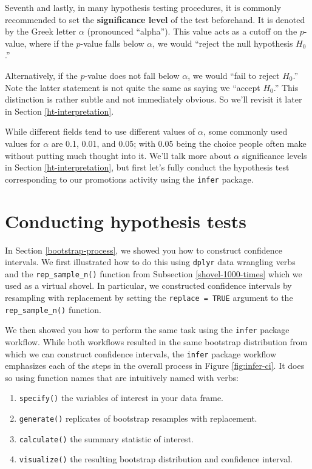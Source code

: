 \documentclass[
]{book}
\providecommand{\tightlist}{%
  \setlength{\itemsep}{0pt}\setlength{\parskip}{0pt}}
\begin{document}
Seventh and lastly, in many hypothesis testing procedures, it is commonly recommended to set the \textbf{significance level}  of the test beforehand. It is denoted by the Greek letter \(\alpha\) (pronounced ``alpha''). This value acts as a cutoff on the \(p\)-value, where if the \(p\)-value falls below \(\alpha\), we would ``reject the null hypothesis \(H_0\).''

Alternatively, if the \(p\)-value does not fall below \(\alpha\), we would ``fail to reject \(H_0\).'' Note the latter statement is not quite the same as saying we ``accept \(H_0\).'' This distinction is rather subtle and not immediately obvious. So we'll revisit it later in Section \ref{ht-interpretation}.

While different fields tend to use different values of \(\alpha\), some commonly used values for \(\alpha\) are 0.1, 0.01, and 0.05; with 0.05 being the choice people often make without putting much thought into it. We'll talk more about \(\alpha\) significance levels in Section \ref{ht-interpretation}, but first let's fully conduct the hypothesis test corresponding to our promotions activity using the \texttt{infer} package.

\hypertarget{ht-infer}{%
\section{Conducting hypothesis tests}\label{ht-infer}}

In Section \ref{bootstrap-process}, we showed you how to construct confidence intervals. We first illustrated how to do this using \texttt{dplyr} data wrangling verbs and the \texttt{rep\_sample\_n()} function from Subsection \ref{shovel-1000-times} which we used as a virtual shovel. In particular, we constructed confidence intervals by resampling with replacement by setting the \texttt{replace\ =\ TRUE} argument to the \texttt{rep\_sample\_n()} function.

We then showed you how to perform the same task using the \texttt{infer} package workflow. While both workflows resulted in the same bootstrap distribution from which we can construct confidence intervals, the \texttt{infer} package workflow emphasizes each of the steps in the overall process in Figure \ref{fig:infer-ci}. It does so using function names that are intuitively named with verbs:

\begin{enumerate}
\def\labelenumi{\arabic{enumi}.}
\tightlist
\item
  \texttt{specify()} the variables of interest in your data frame.
\item
  \texttt{generate()} replicates of bootstrap resamples with replacement.
\item
  \texttt{calculate()} the summary statistic of interest.
\item
  \texttt{visualize()} the resulting bootstrap distribution and confidence interval.
\end{enumerate}
\end{document}
